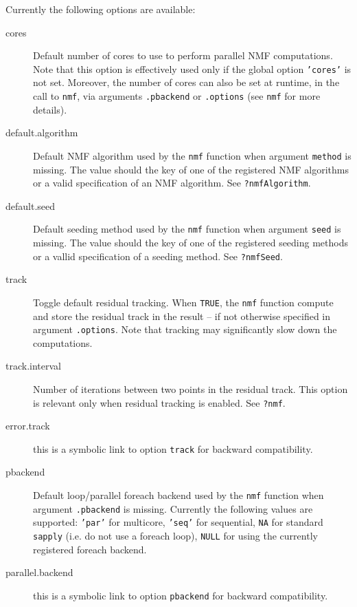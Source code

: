 \documentclass[a4paper]{article}\usepackage[]{graphicx}\usepackage[]{color}
\let\code=\texttt
\begin{document}
Currently the following options are available:

\begin{description}


\item[cores] Default number of cores to use to perform
parallel NMF computations. Note that this option is
effectively used only if the global option \code{'cores'}
is not set. Moreover, the number of cores can also be set
at runtime, in the call to \code{nmf}, via
arguments \code{.pbackend} or \code{.options} (see
\code{nmf} for more details).

\item[default.algorithm] Default NMF algorithm used by
the \code{nmf} function when argument \code{method} is
missing. The value should the key of one of the
registered NMF algorithms or a valid specification of an
NMF algorithm. See \code{?nmfAlgorithm}.

\item[default.seed] Default seeding method used by the
\code{nmf} function when argument \code{seed} is missing.
The value should the key of one of the registered seeding
methods or a vallid specification of a seeding method.
See \code{?nmfSeed}.

\item[track] Toggle default residual tracking. When
\code{TRUE}, the \code{nmf} function compute and store
the residual track in the result -- if not otherwise
specified in argument \code{.options}. Note that tracking
may significantly slow down the computations.

\item[track.interval] Number of iterations between two
points in the residual track. This option is relevant
only when residual tracking is enabled. See \code{?nmf}.

\item[error.track] this is a symbolic link to option
\code{track} for backward compatibility.

\item[pbackend] Default loop/parallel foreach backend
used by the \code{nmf} function when argument
\code{.pbackend} is missing. Currently the following
values are supported: \code{'par'} for multicore,
\code{'seq'} for sequential, \code{NA} for standard
\code{sapply} (i.e. do not use a foreach loop),
\code{NULL} for using the currently registered foreach
backend.

\item[parallel.backend] this is a symbolic link to option
\code{pbackend} for backward compatibility.


\end{description}
\end{document}
